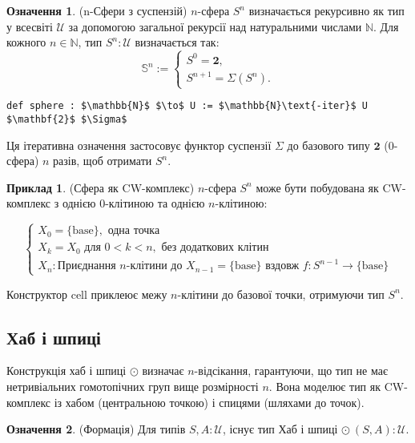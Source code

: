 \documentclass{article}
\theoremstyle{definition}
\newtheorem{definition}{Означення}
\newtheorem{example}{Приклад}
\begin{document}
\begin{definition} (n-Сфери з суспензій)
\( n \)-сфера \( S^n \) визначається рекурсивно як тип у
всесвіті \( \mathcal{U} \) за допомогою загальної рекурсії над натуральними
числами \( \mathbb{N} \). Для кожного \( n \in \mathbb{N} \),
тип \( S^n : \mathcal{U} \) визначається так:
\[
\mathbb{S}^n :=
\begin{cases}
S^0 = \mathbf{2}, \\
S^{n+1} = \Sigma(S^n).
\end{cases}
\]
\begin{lstlisting}[mathescape=true]
def sphere : $\mathbb{N}$ $\to$ U := $\mathbb{N}\text{-iter}$ U $\mathbf{2}$ $\Sigma$
\end{lstlisting}
Ця ітеративна означення застосовує функтор суспензії \( \Sigma \)
до базового типу \( \mathbf{2} \) (0-сфера) \( n \) разів, щоб отримати \( S^n \).
\end{definition}

\begin{example} (Сфера як CW-комплекс)
\( n \)-сфера \( S^n \) може бути побудована як CW-комплекс з
однією 0-клітиною та однією \( n \)-клітиною:

\[
\begin{cases}
X_0 = \{ \text{base} \}, \text{ одна точка} \\
X_k = X_0 \text{ для } 0 < k < n, \text{ без додаткових клітин} \\
X_n: \text{Приєднання } n\text{-клітини до } X_{n-1} = \{ \text{base} \} \text{ вздовж } f : S^{n-1} \to \{ \text{base} \}
\end{cases}
\]

Конструктор \( \text{cell} \) приклеює межу \( n \)-клітини
до базової точки, отримуючи тип \( S^n \).
\end{example}

\newpage
\subsection{Хаб і шпиці}
Конструкція хаб і шпиці \( \odot \) визначає \( n \)-відсікання,
гарантуючи, що тип не має нетривіальних гомотопічних груп вище
розмірності \( n \). Вона моделює тип як CW-комплекс із
хабом (центральною точкою) і спицями (шляхами до точок).

\begin{definition} (Формація)
Для типів \( S, A : \mathcal{U} \), існує тип Хаб і шпиці \( \odot\ (S,A) : \mathcal{U} \).
\end{definition}
\end{document}
